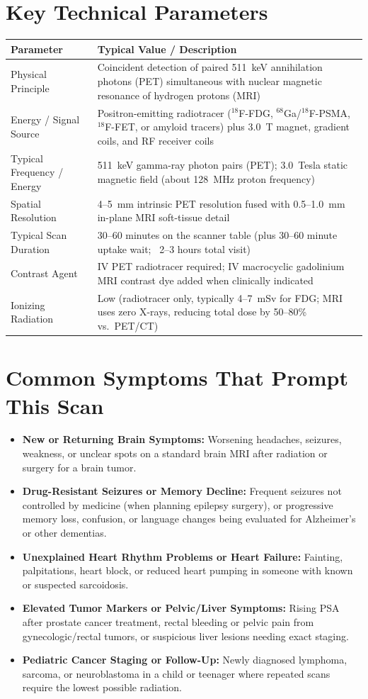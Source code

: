 \section{Key Technical Parameters}
\noindent
\begin{tabularx}{\textwidth}{@{}l X@{}}
\toprule
\textbf{Parameter} & \textbf{Typical Value / Description} \\
\midrule
Physical Principle & Coincident detection of paired 511~keV annihilation photons (PET) simultaneous with nuclear magnetic resonance of hydrogen protons (MRI) \\
Energy / Signal Source & Positron-emitting radiotracer ($^{18}$F-FDG, $^{68}$Ga/$^{18}$F-PSMA, $^{18}$F-FET, or amyloid tracers) plus 3.0~T magnet, gradient coils, and RF receiver coils \\
Typical Frequency / Energy & 511~keV gamma-ray photon pairs (PET); 3.0~Tesla static magnetic field (about 128~MHz proton frequency) \\
Spatial Resolution & 4--5~mm intrinsic PET resolution fused with 0.5--1.0~mm in-plane MRI soft-tissue detail \\
Typical Scan Duration & 30--60 minutes on the scanner table (plus 30--60 minute uptake wait; ~2--3 hours total visit) \\
Contrast Agent & IV PET radiotracer required; IV macrocyclic gadolinium MRI contrast dye added when clinically indicated \\
Ionizing Radiation & Low (radiotracer only, typically 4--7~mSv for FDG; MRI uses zero X-rays, reducing total dose by 50--80\% vs.\ PET/CT) \\
\bottomrule
\end{tabularx}

\section{Common Symptoms That Prompt This Scan}
\begin{itemize}
\item \textbf{New or Returning Brain Symptoms:} Worsening headaches, seizures, weakness, or unclear spots on a standard brain MRI after radiation or surgery for a brain tumor.
\item \textbf{Drug-Resistant Seizures or Memory Decline:} Frequent seizures not controlled by medicine (when planning epilepsy surgery), or progressive memory loss, confusion, or language changes being evaluated for Alzheimer's or other dementias.
\item \textbf{Unexplained Heart Rhythm Problems or Heart Failure:} Fainting, palpitations, heart block, or reduced heart pumping in someone with known or suspected sarcoidosis.
\item \textbf{Elevated Tumor Markers or Pelvic/Liver Symptoms:} Rising PSA after prostate cancer treatment, rectal bleeding or pelvic pain from gynecologic/rectal tumors, or suspicious liver lesions needing exact staging.
\item \textbf{Pediatric Cancer Staging or Follow-Up:} Newly diagnosed lymphoma, sarcoma, or neuroblastoma in a child or teenager where repeated scans require the lowest possible radiation.
\end{itemize}

